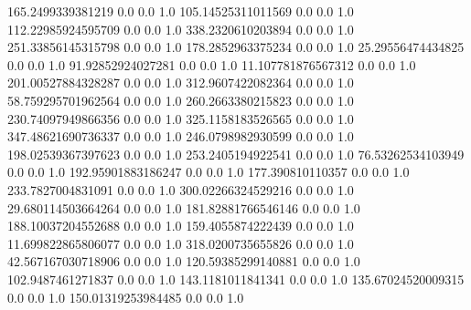 165.2499339381219	0.0	0.0	1.0
105.14525311011569	0.0	0.0	1.0
112.22985924595709	0.0	0.0	1.0
338.2320610203894	0.0	0.0	1.0
251.33856145315798	0.0	0.0	1.0
178.2852963375234	0.0	0.0	1.0
25.29556474434825	0.0	0.0	1.0
91.92852924027281	0.0	0.0	1.0
11.107781876567312	0.0	0.0	1.0
201.00527884328287	0.0	0.0	1.0
312.9607422082364	0.0	0.0	1.0
58.759295701962564	0.0	0.0	1.0
260.2663380215823	0.0	0.0	1.0
230.74097949866356	0.0	0.0	1.0
325.1158183526565	0.0	0.0	1.0
347.48621690736337	0.0	0.0	1.0
246.0798982930599	0.0	0.0	1.0
198.02539367397623	0.0	0.0	1.0
253.2405194922541	0.0	0.0	1.0
76.53262534103949	0.0	0.0	1.0
192.95901883186247	0.0	0.0	1.0
177.390810110357	0.0	0.0	1.0
233.7827004831091	0.0	0.0	1.0
300.02266324529216	0.0	0.0	1.0
29.680114503664264	0.0	0.0	1.0
181.82881766546146	0.0	0.0	1.0
188.10037204552688	0.0	0.0	1.0
159.4055874222439	0.0	0.0	1.0
11.699822865806077	0.0	0.0	1.0
318.0200735655826	0.0	0.0	1.0
42.567167030718906	0.0	0.0	1.0
120.59385299140881	0.0	0.0	1.0
102.9487461271837	0.0	0.0	1.0
143.1181011841341	0.0	0.0	1.0
135.67024520009315	0.0	0.0	1.0
150.01319253984485	0.0	0.0	1.0